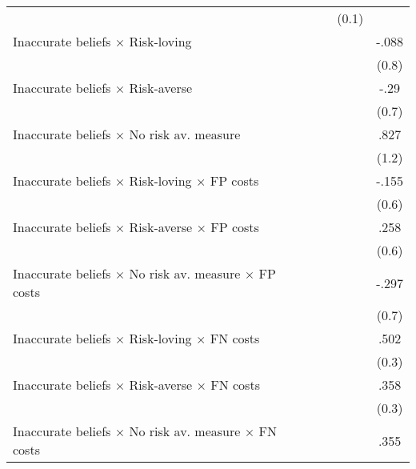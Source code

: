 \begin{table}[htbp]
\begin{tabular}{l*{4}{c}}
                &                  &                  &    (0.1)         &                  \\
Inaccurate beliefs $\times$ Risk-loving&                  &                  &                  &    -.088         \\
                &                  &                  &                  &    (0.8)         \\
Inaccurate beliefs $\times$ Risk-averse&                  &                  &                  &     -.29         \\
                &                  &                  &                  &    (0.7)         \\
Inaccurate beliefs $\times$ No risk av. measure&                  &                  &                  &     .827         \\
                &                  &                  &                  &    (1.2)         \\
Inaccurate beliefs $\times$ Risk-loving $\times$ FP costs&                  &                  &                  &    -.155         \\
                &                  &                  &                  &    (0.6)         \\
Inaccurate beliefs $\times$ Risk-averse $\times$ FP costs&                  &                  &                  &     .258         \\
                &                  &                  &                  &    (0.6)         \\
Inaccurate beliefs $\times$ No risk av. measure $\times$ FP costs&                  &                  &                  &    -.297         \\
                &                  &                  &                  &    (0.7)         \\
Inaccurate beliefs $\times$ Risk-loving $\times$ FN costs&                  &                  &                  &     .502         \\
                &                  &                  &                  &    (0.3)         \\
Inaccurate beliefs $\times$ Risk-averse $\times$ FN costs&                  &                  &                  &     .358         \\
                &                  &                  &                  &    (0.3)         \\
Inaccurate beliefs $\times$ No risk av. measure $\times$ FN costs&                  &                  &                  &     .355         \\

\end{tabular}
\end{table}
